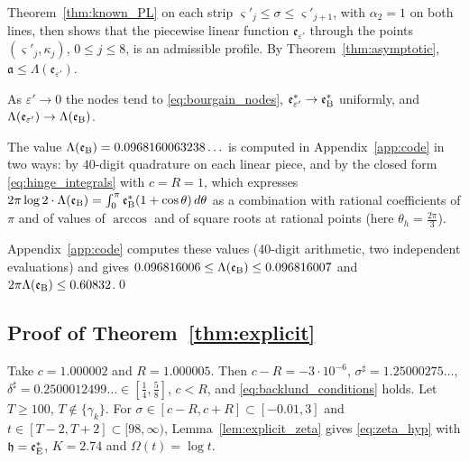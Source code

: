 \documentclass[11pt,a4paper]{article}
\makeatletter
\numberwithin{equation}{section}
\DeclareRobustCommand{\CGref}[1]{\ref{#1}}
\DeclareRobustCommand{\CGeqref}[1]{\eqref{#1}}
\let\CG@origref\ref
\let\CG@origeqref\eqref
\newcommand{\CG@gettip}[1]{\@ifundefined{CGTip@#1}{#1}{\csname CGTip@#1\endcsname}}
\DeclareRobustCommand{\CGref}[1]{\pdftooltip{\CG@origref{#1}}{\CG@gettip{#1}}}
\DeclareRobustCommand{\CGeqref}[1]{\pdftooltip{\CG@origeqref{#1}}{\CG@gettip{#1}}}
\theoremstyle{definition}
\theoremstyle{remark}
\newcommand{\eB}{\mathfrak e_{\rm B}}
\newcommand{\eE}{\mathfrak e_{\rm E}}
\makeatother
\begin{document}
Theorem~\CGref{thm:known_PL} on each strip $\varsigma'_j\le\sigma\le\varsigma'_{j+1}$, with $\alpha_2=1$ on both lines, then shows that the piecewise linear function $\mathfrak e_{\varepsilon'}$ through the points $(\varsigma'_j,\kappa_j)$, $0\le j\le8$, is an admissible profile. By Theorem~\CGref{thm:asymptotic}, $\mathfrak a\le\Lambda(\mathfrak e_{\varepsilon'})$.

As $\varepsilon'\to0$ the nodes tend to \CGeqref{eq:bourgain_nodes}, $\mathfrak e^*_{\varepsilon'}\to\eB^*$ uniformly, and $\Lambda(\mathfrak e_{\varepsilon'})\to\Lambda(\eB)$.

The value $\Lambda(\eB)=0.0968160063238\ldots$ is computed in Appendix~\CGref{app:code} in two ways: by $40$-digit quadrature on each linear piece, and by the closed form \CGeqref{eq:hinge_integrals} with $c=R=1$, which expresses $2\pi\log2\cdot\Lambda(\eB)=\int_0^\pi\eB^*(1+\cos\theta)\,d\theta$ as a combination with rational coefficients of $\pi$ and of values of $\arccos$ and of square roots at rational points (here $\theta_h=\frac{2\pi}3$).

Appendix~\CGref{app:code} computes these values (40-digit arithmetic, two independent evaluations) and gives $0.096816006\le\Lambda(\eB)\le0.096816007$ and $2\pi\Lambda(\eB)\le0.60832$.\qed

\subsection{Proof of Theorem~\ref{thm:explicit}}\label{subsec:proof_explicit}
Take $c=1.000002$ and $R=1.000005$. Then $c-R=-3\cdot10^{-6}$, $\sigma^\sharp=1.25000275\ldots$, $\delta^\sharp=0.2500012499\ldots\in[\frac14,\frac58]$, $c<R$, and \CGeqref{eq:backlund_conditions} holds. Let $T\ge100$, $T\notin\{\gamma_k\}$. For $\sigma\in[c-R,c+R]\subset[-0.01,3]$ and $t\in[T-2,T+2]\subset[98,\infty)$, Lemma~\CGref{lem:explicit_zeta} gives \CGeqref{eq:zeta_hyp} with $\mathfrak h=\eE^*$, $K=2.74$ and $\Omega(t)=\log t$.
\end{document}
